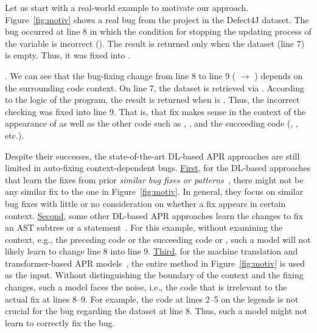 Let us start with a real-world example to motivate our approach.
Figure~\ref{fig:motiv} shows a real bug from the project 
in the Defect4J dataset. The bug occurred at line 8 in which the
condition for stopping the updating process of the 
variable is incorrect (). The result is
returned only when the dataset (line 7) is empty. Thus, it was fixed
into .

. We
can see that the bug-fixing change from line 8 to line 9 ( $\rightarrow$ )
depends on the surrounding code context. On line 7, the dataset is
retrieved via . According to the logic of the
program, the result is returned when  is .
Thus, the incorrect checking was fixed into line 9. That is, that fix
makes sense in the context of the appearance of  as
well as the other code such as ,
, and the succeeding code
(, , etc.).

Despite their successes, the state-of-the-art DL-based APR approaches
are still limited in auto-fixing context-dependent
bugs. \underline{First}, for the DL-based approaches that learn the
fixes from prior {\em similar bug fixes or
  patterns}~\cite{gupta2017deepfix,white2019sorting,white2016deep},
there might not be any similar fix to the one in
Figure~\ref{fig:motiv}. In general, they focus on similar bug fixes
with little or no consideration on whether a fix appears in certain
context.  \underline{Second}, some other DL-based APR approaches learn
the changes to fix an AST subtree or a
statement~\cite{chakrabortycodit,see2017get}. For this example,
without examining the context, e.g., the preceding code
 or the succeeding code  or
, such a model will not likely learn to change
line 8 into line 9. \underline{Third}, for the machine translation and
transformer-based APR
models~\cite{chen2018sequencer,hata2018learning}, the entire method in
Figure~\ref{fig:motiv} is used as the input. Without distinguishing
the boundary of the context and the fixing changes, such a model faces
the noise, i.e., the code that is irrelevant to the actual fix at
lines 8--9. For example, the code at lines 2--5 on the legends is not
crucial for the bug regarding the dataset at line 8. Thus, such a
model might not learn to correctly fix the bug.

